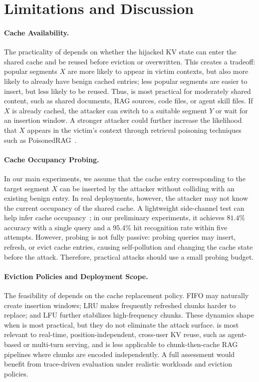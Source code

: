 \section{Limitations and Discussion}
\label{sec:discussion}

\paragraph{Cache Availability.}
The practicality of \sys depends on whether the hijacked KV state can enter the shared cache and be reused before eviction or overwritten. This creates a tradeoff: popular segments $X$ are more likely to appear in victim contexts, but also more likely to already have benign cached entries; less popular segments are easier to insert, but less likely to be reused. Thus, \sys is most practical for moderately shared content, such as shared documents, RAG sources, code files, or agent skill files. If $X$ is already cached, the attacker can switch to a suitable segment $Y$ or wait for an insertion window.
A stronger attacker could further increase the likelihood that $X$ appears in the victim's context through retrieval poisoning techniques such as PoisonedRAG~\cite{zou2025poisonedrag}.

\paragraph{Cache Occupancy Probing.}In our main experiments, we assume that the cache entry corresponding to the target segment $X$ can be inserted by the attacker without colliding with an existing benign entry. In real deployments, however, the attacker may not know the current occupancy of the shared cache. A lightweight side-channel test can help infer cache occupancy~\cite{gu2025auditing, song2025early}; in our preliminary experiments, it achieves $81.4\%$ accuracy with a single query and a $95.4\%$ hit recognition rate within five attempts. However, probing is not fully passive: probing queries may insert, refresh, or evict cache entries, causing self-pollution and changing the cache state before the attack. Therefore, practical attacks should use a small probing budget.


\paragraph{Eviction Policies and Deployment Scope.}
The feasibility of \sys depends on the cache replacement policy. FIFO may naturally create insertion windows; LRU makes frequently refreshed chunks harder to replace; and LFU further stabilizes high-frequency chunks. These dynamics shape when \sys is most practical, but they do not eliminate the attack surface. \sys is most relevant to real-time, position-independent, cross-user KV reuse, such as agent-based or multi-turn serving, and is less applicable to chunk-then-cache RAG pipelines where chunks are encoded independently. A full assessment would benefit from trace-driven evaluation under realistic workloads and eviction policies.
